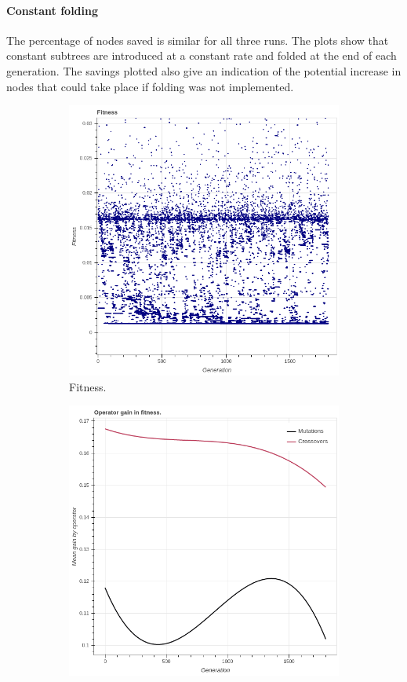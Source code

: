 \paragraph{Constant folding}
The percentage of nodes saved is similar for all three runs. The plots show that constant subtrees are introduced at a constant rate and folded at the end of each generation. The savings plotted also give an indication of the potential increase in nodes that could take place if folding was not implemented. 
 \begin{figure}
    \begin{subfigure}{0.5\textwidth}
        \includegraphics[width=0.8\linewidth]{figures/incrementalfitness30s.png}
        \caption{Fitness.}
    \end{subfigure}
    \begin{subfigure}{0.5\textwidth}
        \includegraphics[width=0.8\linewidth]{figures/incrementaloperatorgain30s.png}

\end{subfigure}
\end{figure}
